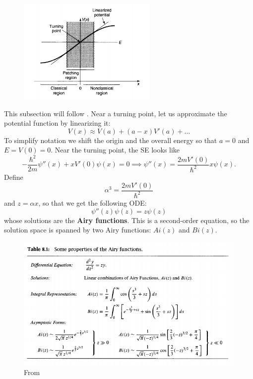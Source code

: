 \documentclass{book}
\theoremstyle{definition}
\newcommand{\al}{\alpha}
\newcommand{\f}[2]{\frac{#1}{#2}}
\begin{document}
\begin{figure}[!htb]
	\centering
	\includegraphics[width=0.6\textwidth]{images/wkb_1}
\end{figure}

This subsection will follow \cite{griffiths2018introduction}. Near a turning point, let us approximate the potential function by linearizing it:
\begin{equation*}
V(x) \approx V(a) + (a-x)V'(a) + \dots
\end{equation*}
To simplify notation we shift the origin and the overall energy so that $a=0$ and $E = V(0) = 0$. Near the turning point, the SE looks like 
\begin{equation*}
-\f{\hbar^2}{2m} \psi''(x) + xV'(0) \psi(x) = 0 \implies \psi''(x) = \f{2m V'(0)}{\hbar^2} x\psi(x).
\end{equation*} 
Define 
\begin{equation*}
\al^3 =  \f{2m V'(0)}{\hbar^2} 
\end{equation*}
and $z = \al x$, so that we get the following ODE:
\begin{equation*}
\boxed{\psi''(z) \psi(z) = z\psi(z)}
\end{equation*}
whose solutions are the \textbf{Airy functions}. This is a second-order equation, so the solution space is spanned by two Airy functions: $Ai(z)$ and $Bi(z)$. \\


\begin{figure}[!htb]
	\centering
	\includegraphics[width=1\textwidth]{images/wkb_2}
	\caption{From \cite{griffiths2018introduction}}
\end{figure}
\end{document}

